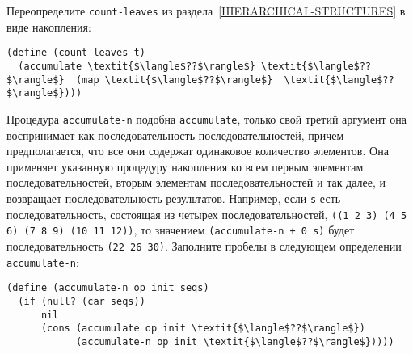 \begin{exercise}{2.35}\label{EX2.35}%
Переопределите {\tt count-leaves} из 
раздела~\ref{HIERARCHICAL-STRUCTURES} в виде
накопления: 

\begin{Verbatim}[fontsize=\small]
(define (count-leaves t)
  (accumulate \textit{$\langle$??$\rangle$} \textit{$\langle$??$\rangle$}  (map \textit{$\langle$??$\rangle$}  \textit{$\langle$??$\rangle$})))
\end{Verbatim}
\end{exercise}
\begin{exercise}{2.36}\label{EX2.36}%
Процедура {\tt accumulate-n} подобна
{\tt accumulate}, только свой третий аргумент она воспринимает
как последовательность последовательностей, причем предполагается, что 
все они содержат одинаковое количество элементов. Она применяет
указанную процедуру накопления ко всем первым элементам
последовательностей, вторым элементам последовательностей и так далее, 
и возвращает последовательность результатов.  Например, если
{\tt s} есть последовательность, состоящая из четырех
последовательностей, {\tt ((1 2 3) (4 5 6) (7 8 9) (10 11
12))}, то значением {\tt (accumulate-n + 0 s)} будет
последовательность {\tt (22 26 30)}.  Заполните пробелы в
следующем определении {\tt accumulate-n}:

\begin{Verbatim}[fontsize=\small]
(define (accumulate-n op init seqs)
  (if (null? (car seqs))
      nil
      (cons (accumulate op init \textit{$\langle$??$\rangle$})
            (accumulate-n op init \textit{$\langle$??$\rangle$}))))
\end{Verbatim}
\end{exercise}
